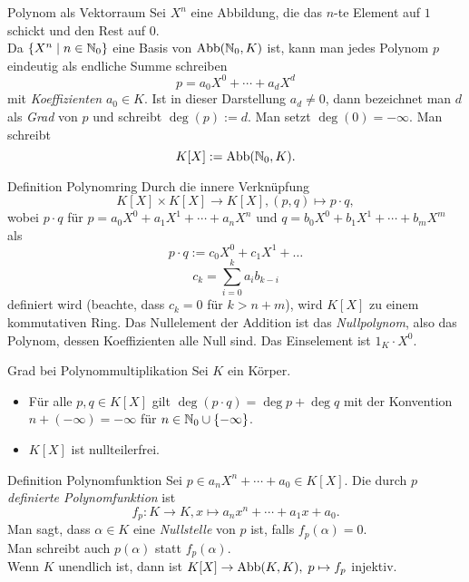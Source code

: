 \documentclass[main.tex]{subfiles}
\begin{document}
\begin{karte}{Polynom als Vektorraum}
    Sei \( X^n \) eine Abbildung, die das \(n\)-te Element auf 
    \(1\) schickt und den Rest auf \(0\).\\
    Da \( \{X^n \;\vert \; n\in \mathbb{N}_0\} \) eine Basis von 
    \( \operatorname{Abb}(\mathbb{N}_0, K) \) ist, kann man jedes 
    Polynom \(p\) eindeutig als endliche Summe schreiben 
    \[ p = a_0 X^0 + \cdots + a_d X^d \] 
    mit \textit{Koeffizienten} \( a_0 \in K \). Ist in dieser 
    Darstellung \( a_d \neq 0 \), dann bezeichnet man \(d\) als 
    \textit{Grad} von \(p\) und schreibt \( \deg(p) := d \). Man 
    setzt \( \deg(0) = -\infty \). Man schreibt 
    \[ K[X] := \operatorname{Abb}(\mathbb{N}_0, K). \]
\end{karte}
\begin{karte}{Definition Polynomring}
    Durch die innere Verknüpfung 
    \[ K[X] \times K[X] \rightarrow K[X], 
    (p,q) \mapsto p \cdot q, \]
    wobei \( p \cdot q \) für \( p = a_0 X^0 + a_1 X^1 
    + \cdots + a_n X^n \) und \( q = b_0 X^0 + b_1 X^1 
    + \cdots + b_m X^m \) als 
    \[ p \cdot q := c_0 X^0 + c_1 X^1 + \ldots \]
    \[ c_k = \sum_{i=0}^k a_i b_{k-i} \]
    definiert wird (beachte, dass \(c_k = 0\) für 
    \( k > n + m \)), wird \( K[X] \) zu einem kommutativen Ring. 
    Das Nullelement der Addition ist das \textit{Nullpolynom}, 
    also das Polynom, dessen Koeffizienten alle Null sind. 
    Das Einselement ist \( 1_K \cdot X^0 \).
\end{karte}
\begin{karte}{Grad bei Polynommultiplikation}
    Sei \(K\) ein Körper. 
    \begin{itemize}
        \item Für alle \( p,q \in K[X] \) gilt 
        \( \deg(p \cdot q) = \deg p + \deg q \) mit der 
        Konvention \( n + (-\infty) = -\infty \) für 
        \( n \in \mathbb{N}_0 \cup \{-\infty\} \).
        \item \( K[X] \) ist nullteilerfrei.
    \end{itemize}
\end{karte}
\begin{karte}{Definition Polynomfunktion}
    Sei \( p \in a_n X^n + \cdots + a_0 \in K[X] \). Die 
    durch \(p\) \textit{definierte Polynomfunktion} ist 
    \[ f_p : K \rightarrow K, x \mapsto a_n x^n + \cdots 
    + a_1 x + a_0. \]
    Man sagt, dass \( \alpha \in K \) eine \textit{Nullstelle} 
    von \(p\) ist, falls \( f_p(\alpha) = 0 \). \\
    Man schreibt auch \( p(\alpha) \) statt \(f_p(\alpha)\).\\
    Wenn \(K\) unendlich ist, dann ist 
    \( K[X] \rightarrow \operatorname{Abb}(K,K), \; p \mapsto f_p \) injektiv.
\end{karte}
\end{document}
